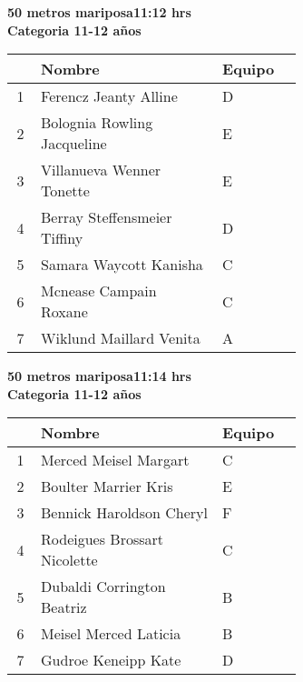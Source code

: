 \begin{minipage}{0.95\linewidth}\vspace{0.5cm} 
\begin{flushleft}
\textbf{
\hspace{-0.15cm}50 metros mariposa\hspace{1.5cm}11:12 hrs \\Categoria 11-12 años}\vspace{-0.2cm} 
\end{flushleft}
\begin{tabular}{cp{0.63\linewidth}l}
\hline
& \textbf{Nombre} & \textbf{Equipo} \\ \hline
1 & Ferencz Jeanty Alline & D \\ 
2 & Bolognia Rowling Jacqueline & E \\ 
3 & Villanueva Wenner Tonette & E \\ 
4 & Berray Steffensmeier Tiffiny & D \\ 
5 & Samara Waycott Kanisha & C \\ 
6 & Mcnease Campain Roxane & C \\ 
7 & Wiklund Maillard Venita & A \\ 
\end{tabular}
\end{minipage}
\begin{minipage}{0.95\linewidth}\vspace{0.5cm} 
\begin{flushleft}
\textbf{
\hspace{-0.15cm}50 metros mariposa\hspace{1.5cm}11:14 hrs \\Categoria 11-12 años}\vspace{-0.2cm} 
\end{flushleft}
\begin{tabular}{cp{0.63\linewidth}l}
\hline
& \textbf{Nombre} & \textbf{Equipo} \\ \hline
1 & Merced Meisel Margart & C \\ 
2 & Boulter Marrier Kris & E \\ 
3 & Bennick Haroldson Cheryl & F \\ 
4 & Rodeigues Brossart Nicolette & C \\ 
5 & Dubaldi Corrington Beatriz & B \\ 
6 & Meisel Merced Laticia & B \\ 
7 & Gudroe Keneipp Kate & D \\ 
\end{tabular}
\end{minipage}
